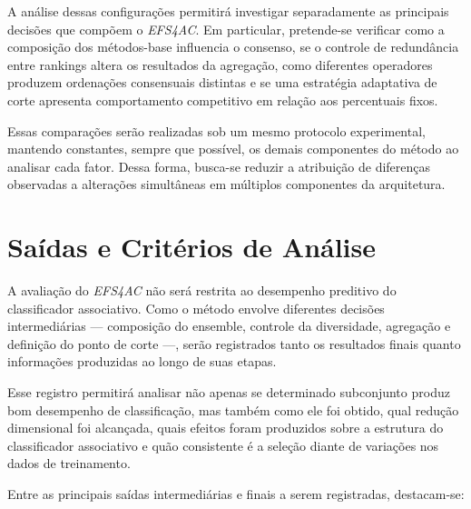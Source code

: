 A análise dessas configurações permitirá investigar separadamente as principais
decisões que compõem o \textit{EFS4AC}. Em particular, pretende-se verificar
como a composição dos métodos-base influencia o consenso, se o controle de
redundância entre rankings altera os resultados da agregação, como diferentes
operadores produzem ordenações consensuais distintas e se uma estratégia
adaptativa de corte apresenta comportamento competitivo em relação aos
percentuais fixos.

Essas comparações serão realizadas sob um mesmo protocolo experimental,
mantendo constantes, sempre que possível, os demais componentes do método ao
analisar cada fator. Dessa forma, busca-se reduzir a atribuição de diferenças
observadas a alterações simultâneas em múltiplos componentes da arquitetura.
\section{Saídas e Critérios de Análise}
\label{sec:ac-efs-saidas}

A avaliação do \textit{EFS4AC} não será restrita ao desempenho preditivo do
classificador associativo. Como o método envolve diferentes decisões
intermediárias --- composição do ensemble, controle da diversidade, agregação
e definição do ponto de corte ---, serão registrados tanto os resultados
finais quanto informações produzidas ao longo de suas etapas.

Esse registro permitirá analisar não apenas se determinado subconjunto produz
bom desempenho de classificação, mas também como ele foi obtido, qual redução
dimensional foi alcançada, quais efeitos foram produzidos sobre a estrutura do
classificador associativo e quão consistente é a seleção diante de variações
nos dados de treinamento.

Entre as principais saídas intermediárias e finais a serem registradas,
destacam-se:

